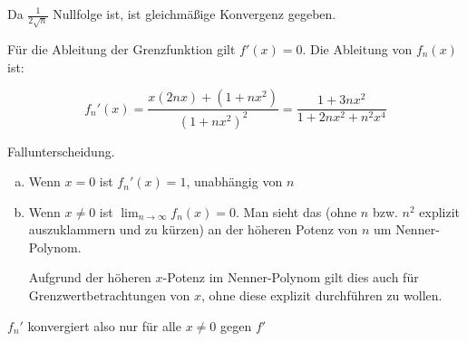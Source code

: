 \documentclass[a4paper,german,12pt,smallheadings]{scrartcl}
\begin{document}
Da $\frac{1}{2\sqrt{n}}$ Nullfolge ist, ist gleichmäßige Konvergenz gegeben.

Für die Ableitung der Grenzfunktion gilt $f'(x) = 0$. Die Ableitung von $f_n(x)$ ist:

\begin{equation*}
  f_n'(x) = \frac{x(2nx) + (1+nx^2)}{(1+nx^2)^2} = \frac{1+ 3nx^2}{1+2nx^2 + n^2x^4}
\end{equation*}

Fallunterscheidung.

\begin{enumerate}[a)]
  \item
    Wenn $x=0$ ist $f_n'(x) = 1$, unabhängig von $n$

  \item
    Wenn $x\neq0$ ist $\lim_{n \to \infty} f_n(x) = 0$. Man sieht das (ohne
    $n$ bzw. $n^2$ explizit auszuklammern und zu kürzen) an der höheren Potenz
    von $n$ um Nenner-Polynom.

    Aufgrund der höheren $x$-Potenz im Nenner-Polynom gilt dies auch für
    Grenzwertbetrachtungen von $x$, ohne diese explizit durchführen zu wollen.
\end{enumerate}

$f_n'$ konvergiert also nur für alle $x \neq 0$ gegen $f'$
\end{document}
